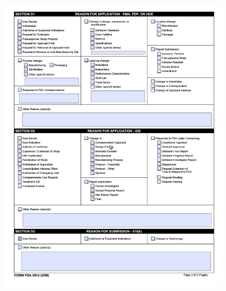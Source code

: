 \begin{figure}[H]
  \centering
  \includegraphics[width=\linewidth]{pages/cdrh-pics/2}
  \label{fig:summary}
\end{figure}

